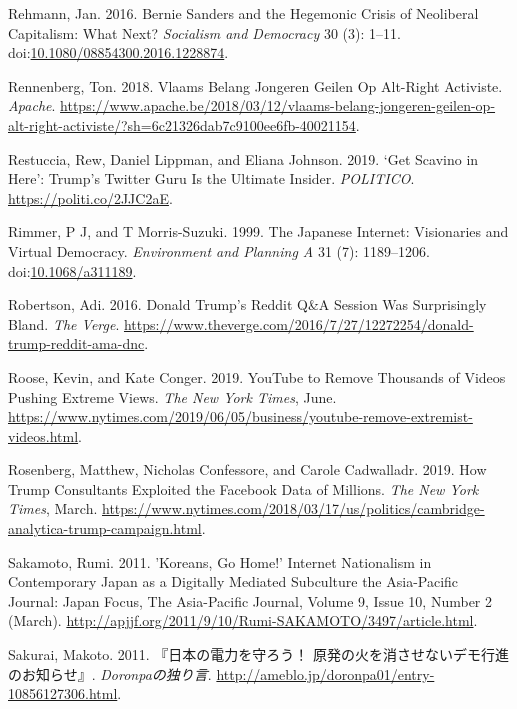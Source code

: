 \documentclass[10pt,british,A4paper,,openany]{memoir}
\begin{document}
\hypertarget{ref-rehmann_bernie_2016}{}
Rehmann, Jan. 2016. Bernie Sanders and the Hegemonic Crisis of
Neoliberal Capitalism: What Next? \emph{Socialism and Democracy} 30 (3):
1--11.
doi:\href{https://doi.org/10.1080/08854300.2016.1228874}{10.1080/08854300.2016.1228874}.

\hypertarget{ref-rennenberg_vlaams_2018}{}
Rennenberg, Ton. 2018. Vlaams Belang Jongeren Geilen Op Alt-Right
Activiste. \emph{Apache}.
\url{https://www.apache.be/2018/03/12/vlaams-belang-jongeren-geilen-op-alt-right-activiste/?sh=6c21326dab7c9100ee6fb-40021154}.

\hypertarget{ref-restuccia_get_2019}{}
Restuccia, Rew, Daniel Lippman, and Eliana Johnson. 2019. `Get Scavino
in Here': Trump's Twitter Guru Is the Ultimate Insider. \emph{POLITICO}.
\url{https://politi.co/2JJC2aE}.

\hypertarget{ref-rimmer_japanese_1999}{}
Rimmer, P J, and T Morris-Suzuki. 1999. The Japanese Internet:
Visionaries and Virtual Democracy. \emph{Environment and Planning A} 31
(7): 1189--1206.
doi:\href{https://doi.org/10.1068/a311189}{10.1068/a311189}.

\hypertarget{ref-robertson_donald_2016}{}
Robertson, Adi. 2016. Donald Trump's Reddit Q\&A Session Was
Surprisingly Bland. \emph{The Verge}.
\url{https://www.theverge.com/2016/7/27/12272254/donald-trump-reddit-ama-dnc}.

\hypertarget{ref-roose_youtube_2019}{}
Roose, Kevin, and Kate Conger. 2019. YouTube to Remove Thousands of
Videos Pushing Extreme Views. \emph{The New York Times}, June.
\url{https://www.nytimes.com/2019/06/05/business/youtube-remove-extremist-videos.html}.

\hypertarget{ref-rosenberg_how_2019}{}
Rosenberg, Matthew, Nicholas Confessore, and Carole Cadwalladr. 2019.
How Trump Consultants Exploited the Facebook Data of Millions. \emph{The
New York Times}, March.
\url{https://www.nytimes.com/2018/03/17/us/politics/cambridge-analytica-trump-campaign.html}.

\hypertarget{ref-sakamoto_koreans_2011}{}
Sakamoto, Rumi. 2011. 'Koreans, Go Home!' Internet Nationalism in
Contemporary Japan as a Digitally Mediated Subculture the Asia-Pacific
Journal: Japan Focus, The Asia-Pacific Journal, Volume 9, Issue 10,
Number 2 (March).
\url{http://apjjf.org/2011/9/10/Rumi-SAKAMOTO/3497/article.html}.

\hypertarget{ref-sakurai__2011}{}
Sakurai, Makoto. 2011. 『日本の電力を守ろう！
原発の火を消させないデモ行進のお知らせ』. \emph{Doronpaの独り言}.
\url{http://ameblo.jp/doronpa01/entry-10856127306.html}.
\end{document}
